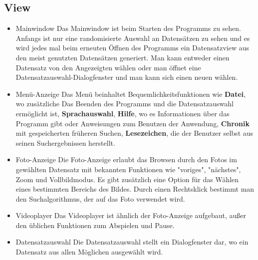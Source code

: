 \subsection{View}
\begin{itemize}
\item Mainwindow \newline
Das Mainwindow ist beim Starten des Programms zu sehen. Anfangs ist nur eine randomisierte Auswahl an Datensätzen zu sehen und es wird jedes mal beim erneuten Öffnen des Programms ein Datensatzview aus den meist genutzten Datensätzen generiert. Man kann entweder einen Datensatz von den Angezeigten wählen oder man öffnet eine Datensatzauswahl-Dialogfenster und man kann sich einen neuen wählen.
\item Menü-Anzeige \newline
Das Menü beinhaltet Bequemlichkeitsfunktionen wie \textbf{Datei}, wo zusätzliche Das Beenden des Programms und die Datensatzauswahl ermöglicht ist, \textbf{Sprachauswahl}, \textbf{Hilfe}, wo es Informationen über das Programm gibt oder Anweisungen zum Benutzen der Anwendung, \textbf{Chronik} mit gespeicherten früheren Suchen, \textbf{Lesezeichen}, die der Benutzer selbst aus seinen Suchergebnissen herstellt.
\item Foto-Anzeige \newline
Die Foto-Anzeige erlaubt das Browsen durch den Fotos im gewählten Datensatz mit bekannten Funktionen wie "voriges", "nächstes", Zoom und Vollbildmodus. Es gibt zusätzlich eine Option für das Wählen eines bestimmten Bereichs des Bildes. Durch einen Rechtsklick bestimmt man den Suchalgorithmus, der auf das Foto verwendet wird.
\item Videoplayer \newline
Das Videoplayer ist ähnlich der Foto-Anzeige aufgebaut, außer den üblichen Funktionen zum Abspielen und Pause.
\item Datensatzauswahl \newline
Die Datensatzauswahl stellt ein Dialogfenster dar, wo ein Datensatz aus allen Möglichen ausgewählt wird.
\end{itemize}	

\pagebreak
